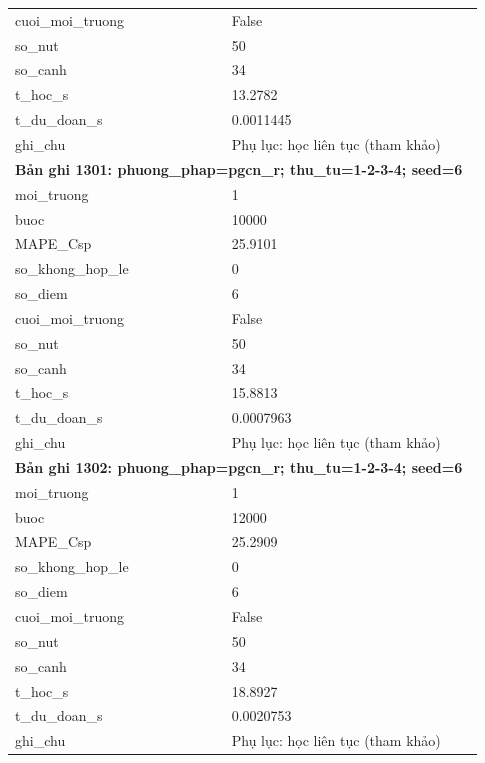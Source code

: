 \begin{longtable}{p{0.43\linewidth}p{0.50\linewidth}}
cuoi\_\allowbreak moi\_\allowbreak truong & False \\
so\_\allowbreak nut & 50 \\
so\_\allowbreak canh & 34 \\
t\_\allowbreak hoc\_\allowbreak s & 13.2782 \\
t\_\allowbreak du\_\allowbreak doan\_\allowbreak s & 0.0011445 \\
ghi\_\allowbreak chu & Phụ lục: học liên tục (tham khảo) \\
\midrule
\multicolumn{2}{p{0.95\linewidth}}{\textbf{Bản ghi 1301: phuong\_phap=pgcn\_r; thu\_tu=1-2-3-4; seed=6}} \\
moi\_\allowbreak truong & 1 \\
buoc & 10000 \\
MAPE\_\allowbreak Csp & 25.9101 \\
so\_\allowbreak khong\_\allowbreak hop\_\allowbreak le & 0 \\
so\_\allowbreak diem & 6 \\
cuoi\_\allowbreak moi\_\allowbreak truong & False \\
so\_\allowbreak nut & 50 \\
so\_\allowbreak canh & 34 \\
t\_\allowbreak hoc\_\allowbreak s & 15.8813 \\
t\_\allowbreak du\_\allowbreak doan\_\allowbreak s & 0.0007963 \\
ghi\_\allowbreak chu & Phụ lục: học liên tục (tham khảo) \\
\midrule
\multicolumn{2}{p{0.95\linewidth}}{\textbf{Bản ghi 1302: phuong\_phap=pgcn\_r; thu\_tu=1-2-3-4; seed=6}} \\
moi\_\allowbreak truong & 1 \\
buoc & 12000 \\
MAPE\_\allowbreak Csp & 25.2909 \\
so\_\allowbreak khong\_\allowbreak hop\_\allowbreak le & 0 \\
so\_\allowbreak diem & 6 \\
cuoi\_\allowbreak moi\_\allowbreak truong & False \\
so\_\allowbreak nut & 50 \\
so\_\allowbreak canh & 34 \\
t\_\allowbreak hoc\_\allowbreak s & 18.8927 \\
t\_\allowbreak du\_\allowbreak doan\_\allowbreak s & 0.0020753 \\
ghi\_\allowbreak chu & Phụ lục: học liên tục (tham khảo) \\

\end{longtable}
